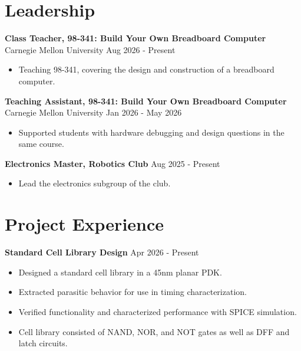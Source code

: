 \documentclass[10pt,letterpaper]{article}
\newcommand{\tightlist}{%
  \setlength{\itemsep}{0pt}%
  \setlength{\leftmargin}{1.0em}%
  \setlength{\parskip}{0pt}%
  \setlength{\topsep}{1.5pt}%
  \setlength{\parsep}{0pt}%
}
\newlength{\cvkeepskip}
\newcommand{\cvkeep}[1]{%
  \begingroup
    \setlength{\cvkeepskip}{#1}%
    \ifdim\pagegoal<\maxdimen
      \addtolength{\cvkeepskip}{\pagetotal}%
      \ifdim\cvkeepskip>\pagegoal
        \newpage
      \fi
    \fi
  \endgroup
}
\newcommand{\entrysep}{\vspace{2pt}\cvkeep{140pt}}
\newcommand{\cvsection}[1]{%
  \vspace*{-11pt}%
  \section*{#1}%
  \vspace*{-10pt}%
}
\newcommand{\cvwhen}[1]{\textsf{#1}}%
\begin{document}
%
\cvsection{Leadership}

\textbf{Class Teacher, 98-341: Build Your Own Breadboard Computer} \\
Carnegie Mellon University \hfill \cvwhen{Aug 2026 - Present}
\begin{itemize}\tightlist
  \item Teaching 98-341, covering the design and construction of a
    breadboard computer.
\end{itemize}

\entrysep
\textbf{Teaching Assistant, 98-341: Build Your Own Breadboard Computer} \\
Carnegie Mellon University \hfill \cvwhen{Jan 2026 - May 2026}
\begin{itemize}\tightlist
  \item Supported students with hardware debugging and design questions in
    the same course.
\end{itemize}

\entrysep
\textbf{Electronics Master, Robotics Club} \hfill \cvwhen{Aug 2025 - Present}
\begin{itemize}\tightlist
  \item Lead the electronics subgroup of the club.
\end{itemize}

\cvsection{Project Experience}

\textbf{Standard Cell Library Design} \hfill \cvwhen{Apr 2026 - Present}
\begin{itemize}\tightlist
  \item Designed a standard cell library in a 45nm planar PDK.
  \item Extracted parasitic behavior for use in timing characterization.
  \item Verified functionality and characterized performance with SPICE
    simulation.
  \item Cell library consisted of NAND, NOR, and NOT gates as well as DFF and
    latch circuits.
\end{itemize}
\end{document}
